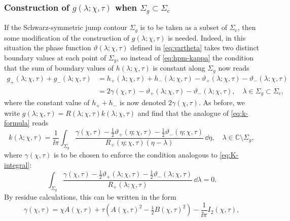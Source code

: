 \subsubsection{Construction of $g(\lambda;\chi,\tau)$ when $\Sigma_g\subset\Sigma_\mathrm{c}$}
\label{sec:g-function-dumbbell}
If the Schwarz-symmetric jump contour $\Sigma_g$ is to be taken as a subset of $\Sigma_\mathrm{c}$,
then some modification of the construction of $g(\lambda;\chi,\tau)$ is needed.  Indeed, in this situation the phase function $\vartheta(\lambda;\chi,\tau)$ defined in \eqref{eq:vartheta} takes two distinct boundary values at each point of $\Sigma_g$, so instead of \eqref{eq:hpm-kappa} the condition that the sum of boundary values of $h(\lambda;\chi,\tau)$ is constant along $\Sigma_g$ now reads
\begin{equation}
\begin{split}
g_+(\lambda;\chi,\tau)+g_-(\lambda;\chi,\tau)&=h_+(\lambda;\chi,\tau)+h_-(\lambda;\chi,\tau)-\vartheta_+(\lambda;\chi,\tau)-\vartheta_-(\lambda;\chi,\tau)\\
&=2\gamma(\chi,\tau)-\vartheta_+(\lambda;\chi,\tau)-\vartheta_-(\lambda;\chi,\tau),\quad
\lambda\in\Sigma_g\subset\Sigma_\mathrm{c},
\end{split}
\label{eq:hpm-gamma}
\end{equation}
where the constant value of $h_++h_-$ is now denoted $2\gamma(\chi,\tau)$.  As before, we write $g(\lambda;\chi,\tau)=R(\lambda;\chi,\tau)k(\lambda;\chi,\tau)$ and find that the analogue of \eqref{eq:k-formula} reads
\begin{equation}
k(\lambda;\chi,\tau)=\frac{1}{\ii\pi}\int_{\Sigma_g}\frac{\gamma(\chi,\tau)-\tfrac{1}{2}\vartheta_+(\eta;\chi,\tau)-\tfrac{1}{2}\vartheta_-(\eta;\chi,\tau)}{R_+(\eta;\chi,\tau)(\eta-\lambda)}\,\dd\eta,\quad\lambda\in\mathbb{C}\setminus\Sigma_g,
\label{eq:k-formula-gamma}
\end{equation}
where $\gamma(\chi,\tau)$ is to be chosen to enforce the condition analogous to \eqref{eq:K-integral}: 
\begin{equation}
\int_{\Sigma_g}\frac{\gamma(\chi,\tau)-\tfrac{1}{2}\vartheta_+(\lambda;\chi,\tau)-\tfrac{1}{2}\vartheta_-(\lambda;\chi,\tau)}{R_+(\lambda;\chi,\tau)}\,\dd\lambda = 0.
\label{eq:K-integral-gamma}
\end{equation}
By residue calculations, this can be written in the form
\begin{equation}
\gamma(\chi,\tau)=\chi A(\chi,\tau)+\tau(A(\chi,\tau)^2-\tfrac{1}{2}B(\chi,\tau)^2)-\frac{1}{\ii\pi}I_2(\chi,\tau),
\end{equation}
